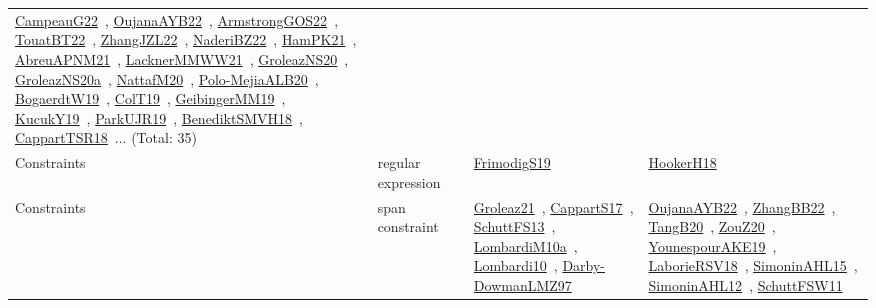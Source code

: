 {\begin{longtable}{lp{3cm}>{\raggedright\arraybackslash}p{6cm}>{\raggedright\arraybackslash}p{6cm}>{\raggedright\arraybackslash}p{8cm}}
\href{works/CampeauG22.pdf}{CampeauG22}~\cite{CampeauG22}, \href{works/OujanaAYB22.pdf}{OujanaAYB22}~\cite{OujanaAYB22}, \href{works/ArmstrongGOS22.pdf}{ArmstrongGOS22}~\cite{ArmstrongGOS22}, \href{works/TouatBT22.pdf}{TouatBT22}~\cite{TouatBT22}, \href{works/ZhangJZL22.pdf}{ZhangJZL22}~\cite{ZhangJZL22}, \href{works/NaderiBZ22.pdf}{NaderiBZ22}~\cite{NaderiBZ22}, \href{works/HamPK21.pdf}{HamPK21}~\cite{HamPK21}, \href{works/AbreuAPNM21.pdf}{AbreuAPNM21}~\cite{AbreuAPNM21}, \href{works/LacknerMMWW21.pdf}{LacknerMMWW21}~\cite{LacknerMMWW21}, \href{works/GroleazNS20.pdf}{GroleazNS20}~\cite{GroleazNS20}, \href{works/GroleazNS20a.pdf}{GroleazNS20a}~\cite{GroleazNS20a}, \href{works/NattafM20.pdf}{NattafM20}~\cite{NattafM20}, \href{works/Polo-MejiaALB20.pdf}{Polo-MejiaALB20}~\cite{Polo-MejiaALB20}, \href{works/BogaerdtW19.pdf}{BogaerdtW19}~\cite{BogaerdtW19}, \href{works/ColT19.pdf}{ColT19}~\cite{ColT19}, \href{works/GeibingerMM19.pdf}{GeibingerMM19}~\cite{GeibingerMM19}, \href{works/KucukY19.pdf}{KucukY19}~\cite{KucukY19}, \href{works/ParkUJR19.pdf}{ParkUJR19}~\cite{ParkUJR19}, \href{works/BenediktSMVH18.pdf}{BenediktSMVH18}~\cite{BenediktSMVH18}, \href{works/CappartTSR18.pdf}{CappartTSR18}~\cite{CappartTSR18}... (Total: 35)\\
Constraints & regular expression &  & \href{works/FrimodigS19.pdf}{FrimodigS19}~\cite{FrimodigS19} & \href{works/HookerH18.pdf}{HookerH18}~\cite{HookerH18}\\
Constraints & span constraint &  & \href{works/Groleaz21.pdf}{Groleaz21}~\cite{Groleaz21}, \href{works/CappartS17.pdf}{CappartS17}~\cite{CappartS17}, \href{works/SchuttFS13.pdf}{SchuttFS13}~\cite{SchuttFS13}, \href{works/LombardiM10a.pdf}{LombardiM10a}~\cite{LombardiM10a}, \href{works/Lombardi10.pdf}{Lombardi10}~\cite{Lombardi10}, \href{works/Darby-DowmanLMZ97.pdf}{Darby-DowmanLMZ97}~\cite{Darby-DowmanLMZ97} & \href{works/OujanaAYB22.pdf}{OujanaAYB22}~\cite{OujanaAYB22}, \href{works/ZhangBB22.pdf}{ZhangBB22}~\cite{ZhangBB22}, \href{works/TangB20.pdf}{TangB20}~\cite{TangB20}, \href{works/ZouZ20.pdf}{ZouZ20}~\cite{ZouZ20}, \href{works/YounespourAKE19.pdf}{YounespourAKE19}~\cite{YounespourAKE19}, \href{works/LaborieRSV18.pdf}{LaborieRSV18}~\cite{LaborieRSV18}, \href{works/SimoninAHL15.pdf}{SimoninAHL15}~\cite{SimoninAHL15}, \href{works/SimoninAHL12.pdf}{SimoninAHL12}~\cite{SimoninAHL12}, \href{works/SchuttFSW11.pdf}{SchuttFSW11}~\cite{SchuttFSW11}\\

\end{longtable}}

